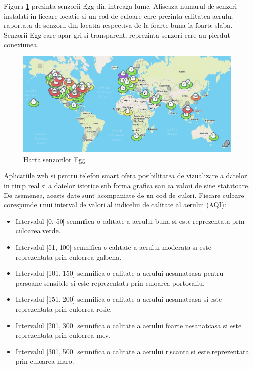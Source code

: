 Figura \ref{fig:sb_airqualityeggmap} prezinta senzorii Egg din intreaga lume. Afiseaza numarul de senzori instalati in fiecare locatie si un cod de culoare care 
prezinta calitatea aerului raportata de senzorii din locatia respectiva de la foarte buna la foarte slaba. Senzorii Egg care apar gri si transparenti reprezinta 
senzori care au pierdut conexiunea.
\begin{figure}[H]
    \centering
    \includegraphics[scale=0.58]{figs/sb_airqualityeggmap.png}
    \caption{Harta senzorilor Egg}
    \label{fig:sb_airqualityeggmap}
\end{figure}

Aplicatiile web si pentru telefon smart ofera posibilitatea de vizualizare a datelor in timp real si a datelor istorice sub forma grafica sau ca valori de sine 
statatoare. De asemenea, aceste date sunt acompaniate de un cod de culori. Fiecare culoare corespunde unui interval de valori al indicelui de calitate al 
aerului (AQI):
\begin{itemize}
	\item Intervalul [0, 50] semnifica o calitate a aerului buna si este reprezentata prin culoarea verde.
	\item Intervalul [51, 100] semnifica o calitate a aerului moderata si este reprezentata prin culoarea galbena.
	\item Intervalul [101, 150] semnifica o calitate a aerului nesanatoasa pentru persoane sensibile si este reprezentata prin culoarea portocaliu.
	\item Intervalul [151, 200] semnifica o calitate a aerului nesanatoasa si este reprezentata prin culoarea rosie.
	\item Intervalul [201, 300] semnifica o calitate a aerului foarte nesanatoasa si este reprezentata prin culoarea mov.
	\item Intervalul [301, 500] semnifica o calitate a aerului riscanta si este reprezentata prin culoarea maro.
\end{itemize}

